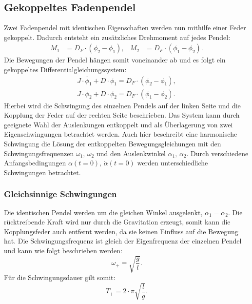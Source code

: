 \subsection{Gekoppeltes Fadenpendel}
Zwei Fadenpendel mit identischen Eigenschaften werden nun mithilfe einer Feder gekoppelt.
Dadurch entsteht ein zusätzliches Drehmoment auf jedes Pendel:
\begin{align*}
    M_1 &= D_F \cdot (\phi_2 -\phi_1),   &M_2 &= D_F \cdot (\phi_1 - \phi_2).
\end{align*}
Die Bewegungen der Pendel hängen somit voneinander ab und es folgt ein gekoppeltes Differentialgleichungssystem:
\begin{align*}
    J \cdot \ddot{\phi_1} + D \cdot \phi_1 = D_F \cdot (\phi_2 -\phi_1), \\
    J \cdot \ddot{\phi_2} + D \cdot \phi_2 = D_F \cdot (\phi_1 -\phi_2).   
\end{align*}
Hierbei wird die Schwingung des einzelnen Pendels auf der linken Seite und die Kopplung der Feder auf der rechten Seite beschrieben.
Das System kann durch geeignete Wahl der Auslenkungen entkoppelt und als Überlagerung von zwei Eigenschwingungen betrachtet werden.
Auch hier beschreibt eine harmonische Schwingung die Lösung der entkoppelten Bewegungsgleichungen mit den Schwingungsfrequenzen $\omega_1, \, \omega_2$
und den Auslenkwinkel $\alpha_1 , \, \alpha_2$.
Durch verschiedene Anfangsbedingungen $\alpha(t=0), \, \dot{\alpha}(t=0)$ werden unterschiedliche Schwingungen betrachtet.

\subsubsection{Gleichsinnige Schwingungen}
\label{subsubsec:gleich_theorie}
Die identischen Pendel werden um die gleichen Winkel ausgelenkt, $\alpha_1 = \alpha_2$.
Die rücktreibende Kraft wird nur durch die Gravitation erzeugt, somit kann die Kopplungsfeder auch entfernt werden, da sie keinen Einfluss auf die Bewegung hat.
Die Schwingungsfrequenz ist gleich der Eigenfrequenz der einzelnen Pendel und kann wie folgt beschrieben werden:
\begin{equation*}
    \omega_+ = \sqrt{\frac{g}{l}}.
\end{equation*}
Für die Schwingungsdauer gilt somit:
\begin{equation} \label{eqn:Tplus}
    T_+ = 2 \cdot \pi \sqrt{\frac{l}{g}}.
\end{equation}

